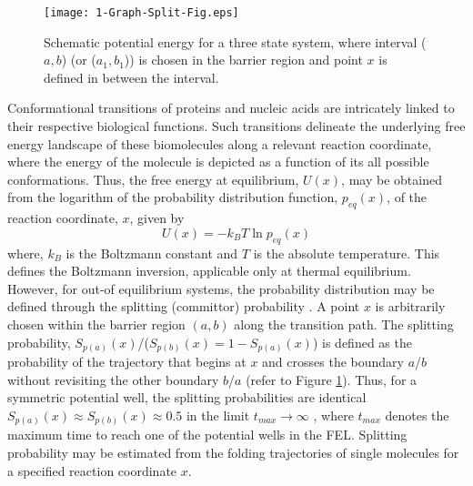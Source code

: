 \documentclass[twoside,twocolumn,9pt]{article}
\begin{document}
\begin{figure}[h!]
\texttt{[image: 1-Graph-Split-Fig.eps]}
\caption{Schematic potential energy for a three state system, where interval ($a,b$) (or ($a_1,b_1$)) 
is chosen in the barrier region and point $x$ is defined in between the interval.}
\label{Schematic-Splitting}
\end{figure}
Conformational transitions of proteins and nucleic acids are intricately linked to their respective
biological functions. Such transitions delineate the underlying free energy landscape of these biomolecules 
along a relevant reaction coordinate, where the energy of the molecule is depicted as a function of its 
all possible conformations. Thus, the free energy at equilibrium, $U(x)$, may be obtained from the logarithm of the 
probability distribution function, $p_{eq}(x)$, of the reaction coordinate, $x$, given by
\begin{equation}
U(x)=-k_{B}T \ln p_{eq}(x)
\label{equilbrium-PDF}
\end{equation} 
where, $k_{B}$ is the Boltzmann constant and $T$ is the absolute temperature. This defines the
Boltzmann inversion, applicable only at thermal equilibrium. However, for out-of equilibrium
systems, the probability 
distribution may be defined through the splitting (committor) probability
\cite{makarov2021barrier,manuel2015reconstructing,covino2019molecular,berezhkovskii2020nonequilibrium}.  
A point $x$ is arbitrarily chosen within the barrier region $(a,b)$ along
the transition path. The splitting probability, $S_{p(a)}(x)$/($S_{p(b)}(x)=1-S_{p(a)}(x)$) is defined as the probability 
of the trajectory that begins at $x$ and crosses the boundary $a$/$b$ without revisiting the other boundary $b$/$a$
\cite{makarov2021barrier,berezhkovskii2020nonequilibrium} (refer to Figure \ref{Schematic-Splitting}).
Thus, for a symmetric potential well, the splitting probabilities are identical 
$S_{p(a)}(x) \approx S_{p(b)}(x) \approx 0.5$ in the limit $t_{max} \to \infty$ \cite{hummer2004transition},
where $t_{max}$ denotes the maximum time to reach one of the potential wells in the FEL.
Splitting probability may be estimated from the folding trajectories of single molecules for a specified reaction
coordinate $x$. 
\end{document}
